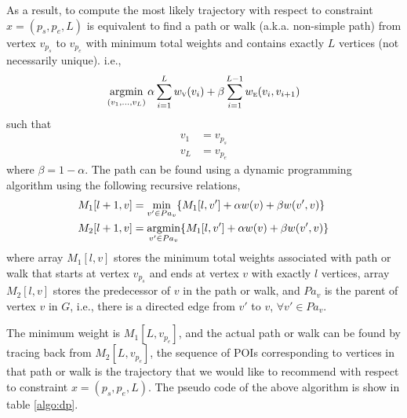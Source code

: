 As a result, to compute the most likely trajectory with respect to constraint $x = (p_s, p_e, L)$ is
equivalent to find a path or walk (a.k.a. non-simple path) from vertex $v_{p_s}$ to $v_{p_e}$
with minimum total weights and contains exactly $L$ vertices (not necessarily unique).
i.e.,
\begin{displaymath}
    \operatorname*{argmin}_{(v_1, \dots, v_L)} \alpha \sum_{i=1}^{L} w_{\textsc{v}}(v_i) +
                                       \beta \sum_{i=1}^{L-1} w_{\textsc{e}}(v_i, v_{i+1})
\end{displaymath}
such that
\begin{align*}
    v_1 &= v_{p_s} \\
    v_L &= v_{p_e}
\end{align*}
where $\beta = 1 - \alpha$.
The path can be found using a dynamic programming algorithm using the following recursive relations,
\begin{align*}
    M_1[l+1, v] &= \min_{v' \in Pa_v} \{ M_1[l, v'] + \alpha w(v) + \beta w(v', v) \} \\
    M_2[l+1, v] &= \operatorname*{argmin}_{v' \in Pa_v} \{ M_1[l, v'] + \alpha w(v) + \beta w(v', v) \}
\end{align*}
where array $M_1[l, v]$ stores the minimum total weights associated with path or walk
that starts at vertex $v_{p_s}$ and ends at vertex $v$ with exactly $l$ vertices,
array $M_2[l, v]$ stores the predecessor of $v$ in the path or walk,
and $Pa_v$ is the parent of vertex $v$ in $G$,
i.e.,
there is a directed edge from $v'$ to $v$, $\forall v' \in Pa_v$.

The minimum weight is $M_1[L, v_{p_e}]$,
and the actual path or walk can be found by tracing back from $M_2[L, v_{p_e}]$,
the sequence of POIs corresponding to vertices in that path or walk is the
trajectory that we would like to recommend with respect to constraint $ x = (p_s, p_e, L)$.
The pseudo code of the above algorithm is show in table \ref{algo:dp}.

